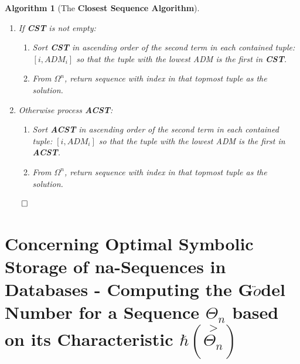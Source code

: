 \documentclass[a4paper, 18pt]{book} %
\newtheorem{alg}{Algorithm}
\begin{document}
\begin{alg}[The \textbf{Closest Sequence Algorithm}]
\begin{enumerate}
{\begin{enumerate}
{\begin{enumerate}
		\end{enumerate}			
	}	
	\end{enumerate}
}
\item {If \textbf{CST} is not empty:
	\begin{enumerate}
	\item Sort  \textbf{CST} in ascending order of the second term in each contained tuple: $[i, ADM_i]$ so that the tuple with the lowest ADM is the first in \textbf{CST}.
	\item From  $\Omega^n$, return sequence with index in that topmost tuple as the solution.
	\end{enumerate}
}
\item {Otherwise process \textbf{ACST}:
	\begin{enumerate}
	\item Sort  \textbf{ACST} in ascending order of the second term in each contained tuple: $[i, ADM_i]$ so that the tuple with the lowest ADM is the first in \textbf{ACST}.
	\item From  $\Omega^n$, return sequence with index in that topmost tuple as the solution.
	\end{enumerate}
}
\end{enumerate}
$\qed$
\end{alg}

\section{Concerning Optimal Symbolic Storage of na-Sequences in Databases - Computing the G$\ddot{o}$del Number for a Sequence $\Theta_n$ based on its Characteristic $\hbar(\overset{>}{\Theta_n})$ }
\label{SECSEQSTORAGE}
\end{document}
